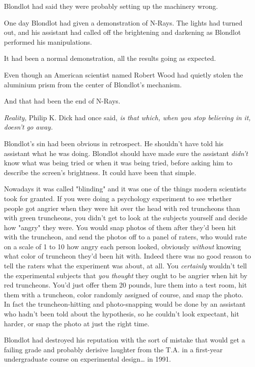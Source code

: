 Blondlot had said they were probably setting up the machinery wrong.

One day Blondlot had given a demonstration of N-Rays. The lights had turned 
out, and his assistant had called off the brightening and darkening as Blondlot 
performed his manipulations.

It had been a normal demonstration, all the results going as expected.

Even though an American scientist named Robert Wood had quietly stolen the 
aluminium prism from the center of Blondlot's mechanism.

And that had been the end of N-Rays.

\emph{Reality,} Philip K. Dick had once said, \emph{is that which, when you 
stop believing in it, doesn't go away.}

Blondlot's sin had been obvious in retrospect. He shouldn't have told his 
assistant what he was doing. Blondlot should have made sure the assistant 
\emph{didn't} know what was being tried or when it was being tried, before 
asking him to describe the screen's brightness. It could have been that simple.

Nowadays it was called "blinding" and it was one of the things modern 
scientists took for granted. If you were doing a psychology experiment to see 
whether people got angrier when they were hit over the head with red truncheons 
than with green truncheons, you didn't get to look at the subjects yourself and 
decide how "angry" they were. You would snap photos of them after they'd been 
hit with the truncheon, and send the photos off to a panel of raters, who would 
rate on a scale of 1 to 10 how angry each person looked, obviously 
\emph{without} knowing what color of truncheon they'd been hit with. Indeed 
there was no good reason to tell the raters what the experiment was about, at 
all. You \emph{certainly} wouldn't tell the experimental subjects that 
\emph{you thought} they ought to be angrier when hit by red truncheons. You'd 
just offer them 20 pounds, lure them into a test room, hit them with a 
truncheon, color randomly assigned of course, and snap the photo. In fact the 
truncheon-hitting and photo-snapping would be done by an assistant who hadn't 
been told about the hypothesis, so he couldn't look expectant, hit harder, or 
snap the photo at just the right time.

Blondlot had destroyed his reputation with the sort of mistake that would get a 
failing grade and probably derisive laughter from the T.A. in a first-year 
undergraduate course on experimental design{\ldots} in 1991.

